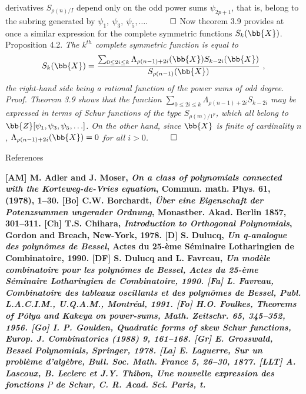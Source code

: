 derivatives $S_{\rho(n)/I}$ depend only on the odd power sums $\psi_{2p+1}$, that 
is, belong to the subring generated by $\psi_1,\ \psi_3,\ \psi_5,\ldots $. $\ \qed$
\medskip
Now theorem 3.9 provides at once a similar expression for the complete 
symmetric functions $S_k({\bb{X}})$.
\medskip
{\petcap Proposition 4.2.} {\it The $k^{th}$ complete symmetric function is 
equal to
$$S_k({\bb{X}})={\sum_{0\leq2i\leq k}
\Lambda_{\rho(n-1)+2i}({\bb{X}})S_{k-2i}({\bb{X}})\over S_{\rho(n-1)}({\bb{X}})}\ ,$$
the right-hand side being a rational function of the power sums of odd 
degree.}
\smallskip
\it Proof. \rm Theorem 3.9 shows that the function $
\sum_{0\leq2i\leq k}\Lambda_{\rho(n-1)+2i}S_{k-2i}$ may be expressed in terms of Schur 
functions of the type $S_{\rho(m)/1^p}$, which all belong to 
${\bb{Z}}[\psi_1,\psi_3,\psi_5,\ldots ]$. On the other hand, since ${\bb{X}}$ 
is finite of 
cardinality $n$, $\Lambda_{\rho(n-1)+2i}({\bb{X}})=0$ for all $i>0$. $\ \qed$
\bigskip
\centerline{\petcap References}
\bigskip
\bf[AM] \rm\hskip 5mm {\petcap M. Adler and J. Moser}, {\it On a class of polynomials
connected with the Korteweg-de-Vries equation}, Commun. math. Phys. 61, (1978), 1--30.
\medskip
\bf[Bo] \rm\hskip 5mm {\petcap C.W. Borchardt}, {\it  \"Uber eine Eigenschaft der 
Potenzsummen ungerader Ordnung}, Monastber. Akad. Berlin 1857, 301--311.
\medskip
\bf[Ch]\rm\hskip 5mm {\petcap T.S. Chihara}, {\it  Introduction to Orthogonal 
Polynomials}, Gordon and Breach, New-York, 1978.
\medskip
\bf[D] \rm\hskip 5mm {\petcap S. Dulucq}, {\it Un q-analogue des polyn\^omes de Bessel},
Actes du 25-\`eme S\'eminaire Lotharingien de Combinatoire, 1990.
\medskip
\bf[DF] \rm\hskip 5mm {\petcap S. Dulucq and L. Favreau}, \it Un mod\`ele combinatoire 
pour les polyn\^omes de Bessel\rm, Actes du 25-\`eme S\'eminaire Lotharingien 
de Combinatoire, 1990.
\medskip
\bf[Fa]\rm\hskip 5mm {\petcap L. Favreau}, {\it  Combinatoire des tableaux 
oscillants et des polyn\^omes de Bessel}, Publ. L.A.C.I.M., U.Q.A.M., 
Montr\'eal, 1991.
\medskip
\bf[Fo]\rm\hskip 5mm {\petcap H.O. Foulkes}, {\it  Theorems of P\'olya and Kakeya 
on power-sums}, Math. Zeitschr. 65, 345--352, 1956.
\medskip
\bf[Go] \rm\hskip 5mm {\petcap I. P. Goulden}, \it Quadratic forms of skew Schur 
functions\rm, Europ. J. Combinatorics (1988) \bf9\rm, 161--168.
\medskip
\bf[Gr] \rm\hskip 5mm {\petcap E. Grosswald}, \it Bessel Polynomials\rm, Springer, 1978.
\medskip
\bf[La]\rm\hskip 5mm {\petcap E. Laguerre}, {\it  Sur un probl\`eme d'alg\`ebre}, 
Bull. Soc. Math. France 5, 26--30, 1877.
\medskip 
\bf[LLT]\rm\hskip 5mm {\petcap A. Lascoux, B. Leclerc et J.Y. Thibon}, {\it  Une 
nouvelle expression des fonctions $P$ de Schur}, C. R. Acad. Sci. Paris, t. 
